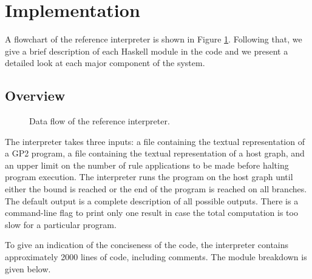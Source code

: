 \section{Implementation}
\label{sec:implementation}

A flowchart of the reference interpreter is shown in Figure \ref{fig:architecture}. Following that, we give a brief description of each Haskell module in the code and we present a detailed look at each major component of the system.

\subsection{Overview}

\begin{figure}
\centering

\caption{Data flow of the reference interpreter.} \label{fig:architecture}
\end{figure}

The interpreter takes three inputs: a file containing the textual representation of a GP2 program, a file containing the textual representation of a host graph, and an upper limit on the number of rule applications to be made before halting program execution. The interpreter runs the program on the host graph until either the bound is reached or the end of the program is reached on all branches. The default output is a complete description of all possible outputs. There is a command-line flag to print only one result in case the total computation is too slow for a particular program.

To give an indication of the conciseness of the code, the interpreter contains approximately 2000 lines of code, including comments. The module breakdown is given below.

